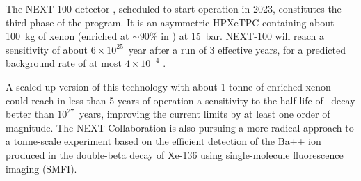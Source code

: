 The NEXT-100 detector \cite{Alvarez:2012sma}, scheduled to start operation in 2023, constitutes the third phase of the program. It is an asymmetric HPXeTPC containing about 100~kg of xenon (enriched at $\sim$90\% in ) at 15~bar. NEXT-100 will reach a sensitivity of about $6\times10^{25}$~year after a run of 3 effective years, for a predicted background rate of at most $4\times10^{-4}$ \ckky.

A scaled-up version of this technology with about 1 tonne of enriched xenon could reach in less than 5 years of operation a sensitivity to the half-life of \bbonu\ decay better than $10^{27}$~years, improving the current limits by at least one order of magnitude. The NEXT Collaboration is also pursuing a more radical approach to a tonne-scale experiment based on the efficient detection of the Ba++ ion produced in the double-beta decay of Xe-136 using single-molecule fluorescence imaging (SMFI).